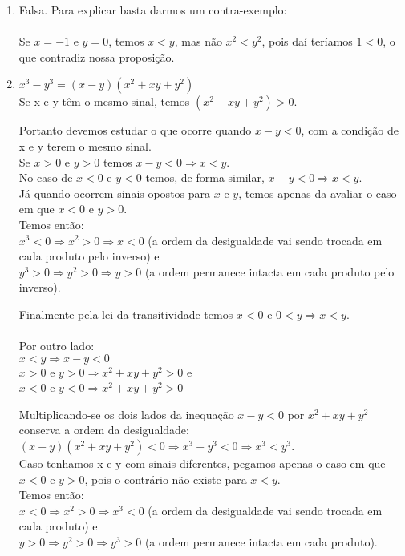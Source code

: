 \begin{enumerate}
\begin{enumerate}
		\end{enumerate}
	\item %
	Falsa. Para explicar basta darmos um contra-exemplo: 
	\paragraph{}Se $x = -1$ e $y = 0$, temos $x < y$, mas não $x^2 < y^2$, pois daí teríamos $1 < 0$, o que contradiz nossa proposição.
	\item 
	$x^3  - y^3 = (x - y)(x^2 + xy + y^2)$\\
	Se x e y têm o mesmo sinal, temos $(x^2 + xy + y^2) > 0$.
	
	Portanto devemos estudar o que ocorre quando $x - y < 0$, com a condição de x e y terem o mesmo sinal.\\
	Se $x > 0$ e $y > 0$ temos $x - y < 0 \Rightarrow x < y$.\\
	No caso de $x < 0$ e $y < 0$ temos, de forma similar, $x - y < 0 \Rightarrow x < y$.\\
	Já quando ocorrem sinais opostos para $x$ e $y$, temos apenas da avaliar o caso em que $x < 0$ e $y > 0$.\\
	Temos então:\\
	$x^3 < 0 \Rightarrow x^2 > 0 \Rightarrow x < 0$ (a ordem da desigualdade vai sendo trocada em cada produto pelo inverso) e\\
	$y^3 > 0 \Rightarrow y^2 > 0 \Rightarrow y > 0$ (a ordem permanece intacta em cada produto pelo inverso).
	
	Finalmente pela lei da transitividade temos $x < 0$ e $0 < y \Rightarrow x < y$.
	\\\\
	Por outro lado:\\
	$x < y \Rightarrow x - y < 0$\\
	$x > 0$ e $y > 0 \Rightarrow x^2 + xy + y^2 > 0$ e\\
    $x < 0$ e $y < 0	\Rightarrow  x^2 + xy + y^2 > 0$
	
	Multiplicando-se os dois lados da inequação $x - y < 0$ por $x^2 + xy + y^2$ conserva a ordem da desigualdade:\\
	$(x - y)(x^2 + xy + y^2) < 0 \Rightarrow x^3 - y^3 < 0 \Rightarrow x^3 < y^3$.\\
	Caso tenhamos x e y com sinais diferentes, pegamos apenas o caso em que $x < 0$ e $y > 0$, pois o contrário não existe para $x < y$.\\
	Temos então:\\
	$x < 0 \Rightarrow x^2 > 0 \Rightarrow x^3 < 0$ (a ordem da desigualdade vai sendo trocada em cada produto) e\\
	$y > 0 \Rightarrow y^2 > 0 \Rightarrow y^3 > 0$ (a ordem permanece intacta em cada produto).
	

\end{enumerate}
